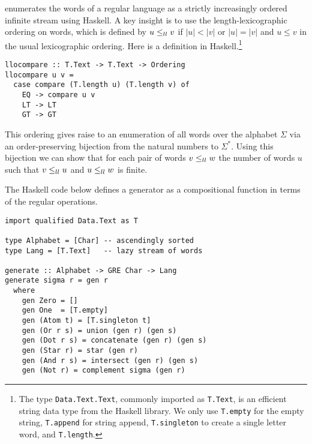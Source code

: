 \citet{DBLP:journals/jfp/McIlroy04} enumerates the words of a regular language as a
strictly increasingly ordered infinite stream using Haskell. A key insight is to use the
length-lexicographic ordering on words, which is defined by $u \le_{ll} v$ if $|u|<|v|$ or
$|u|=|v|$ and $u\le v$ in the usual lexicographic ordering. Here is a definition in Haskell.\footnote{The type
  \lstinline{Data.Text.Text}, commonly imported as \lstinline{T.Text}, is an efficient
  string data type from the Haskell library. We only use \lstinline{T.empty} for the empty
  string, \lstinline{T.append} for string append, \lstinline{T.singleton} to create a
  single letter word, and \lstinline{T.length}.}
\begin{lstlisting}
llocompare :: T.Text -> T.Text -> Ordering
llocompare u v =
  case compare (T.length u) (T.length v) of
    EQ -> compare u v
    LT -> LT
    GT -> GT
\end{lstlisting}
This ordering gives raise to an
enumeration of all words over the alphabet $\Sigma$ via an order-preserving
bijection from the natural numbers to $\Sigma^*$. Using this
bijection we can show that for each pair of words $v \le_{ll} w$ the
number of words $u$ such that $v \le_{ll} u$ and $u \le_{ll} w$ is finite. 


The Haskell code below defines a generator as a compositional function in terms of
the regular operations. 
\begin{lstlisting}
import qualified Data.Text as T

type Alphabet = [Char] -- ascendingly sorted
type Lang = [T.Text]   -- lazy stream of words

generate :: Alphabet -> GRE Char -> Lang
generate sigma r = gen r
  where
    gen Zero = []
    gen One  = [T.empty]
    gen (Atom t) = [T.singleton t]
    gen (Or r s) = union (gen r) (gen s)
    gen (Dot r s) = concatenate (gen r) (gen s)
    gen (Star r) = star (gen r)
    gen (And r s) = intersect (gen r) (gen s)
    gen (Not r) = complement sigma (gen r)
\end{lstlisting}


